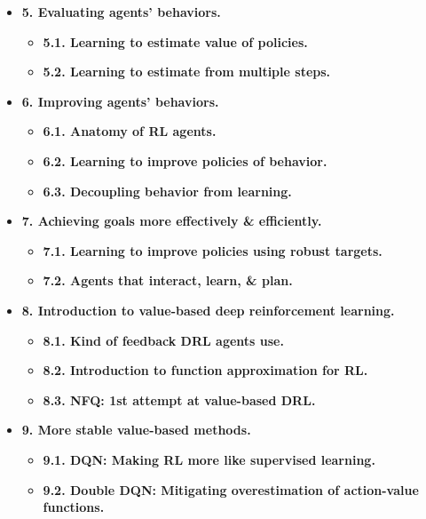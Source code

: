 \documentclass{article}
\begin{document}
\begin{itemize}
\begin{itemize}
\begin{itemize}
            \item {\bf Greedy: Always exploit.}
        \end{itemize}
        \item {\bf4.2. Strategic exploration.}
    \end{itemize}
    \item {\bf5. Evaluating agents' behaviors.}
    \begin{itemize}
        \item {\bf5.1. Learning to estimate value of policies.}
        \item {\bf5.2. Learning to estimate from multiple steps.}
    \end{itemize}
    \item {\bf6. Improving agents' behaviors.}
    \begin{itemize}
        \item {\bf6.1. Anatomy of RL agents.}
        \item {\bf6.2. Learning to improve policies of behavior.}
        \item {\bf6.3. Decoupling behavior from learning.}
    \end{itemize}
    \item {\bf7. Achieving goals more effectively \& efficiently.}
    \begin{itemize}
        \item {\bf7.1. Learning to improve policies using robust targets.}
        \item {\bf7.2. Agents that interact, learn, \& plan.}
    \end{itemize}
    \item {\bf8. Introduction to value-based deep reinforcement learning.}
    \begin{itemize}
        \item {\bf8.1. Kind of feedback DRL agents use.}
        \item {\bf8.2. Introduction to function approximation for RL.}
        \item {\bf8.3. NFQ: 1st attempt at value-based DRL.}
    \end{itemize}
    \item {\bf9. More stable value-based methods.}
    \begin{itemize}
        \item {\bf9.1. DQN: Making RL more like supervised learning.}
        \item {\bf9.2. Double DQN: Mitigating overestimation of action-value functions.}
    \end{itemize}

\end{itemize}
\end{document}
